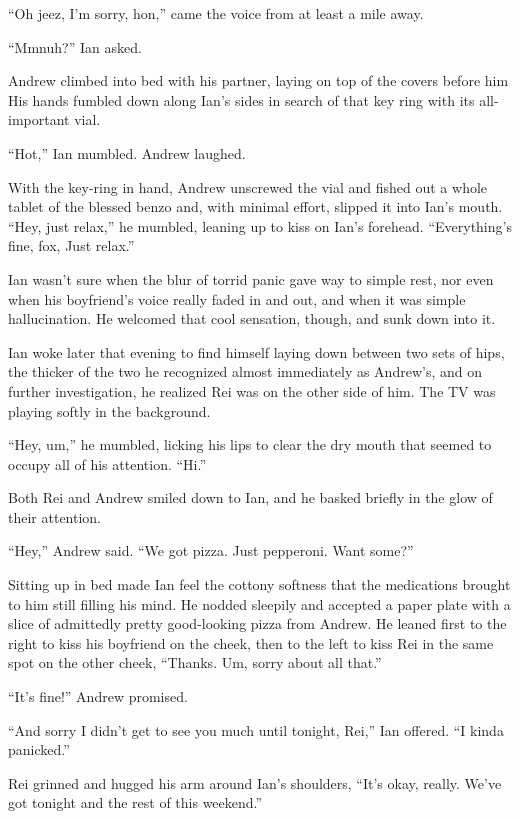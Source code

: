 \secdiv{}

``Oh jeez, I'm sorry, hon,'' came the voice from at least a mile away.

``Mmnuh?'' Ian asked.

Andrew climbed into bed with his partner, laying on top of the covers before him His hands fumbled down along Ian's sides in search of that key ring with its all-important vial.

``Hot,'' Ian mumbled. Andrew laughed.

With the key-ring in hand, Andrew unscrewed the vial and fished out a whole tablet of the blessed benzo and, with minimal effort, slipped it into Ian's mouth. ``Hey, just relax,'' he mumbled, leaning up to kiss on Ian's forehead. ``Everything's fine, fox, Just relax.''

Ian wasn't sure when the blur of torrid panic gave way to simple rest, nor even when his boyfriend's voice really faded in and out, and when it was simple hallucination. He welcomed that cool sensation, though, and sunk down into it.

\secdiv{}

Ian woke later that evening to find himself laying down between two sets of hips, the thicker of the two he recognized almost immediately as Andrew's, and on further investigation, he realized Rei was on the other side of him. The TV was playing softly in the background.

``Hey, um,'' he mumbled, licking his lips to clear the dry mouth that seemed to occupy all of his attention. ``Hi.''

Both Rei and Andrew smiled down to Ian, and he basked briefly in the glow of their attention.

``Hey,'' Andrew said. ``We got pizza. Just pepperoni. Want some?''

Sitting up in bed made Ian feel the cottony softness that the medications brought to him still filling his mind. He nodded sleepily and accepted a paper plate with a slice of admittedly pretty good-looking pizza from Andrew. He leaned first to the right to kiss his boyfriend on the cheek, then to the left to kiss Rei in the same spot on the other cheek, ``Thanks. Um, sorry about all that.''

``It's fine!'' Andrew promised.

``And sorry I didn't get to see you much until tonight, Rei,'' Ian offered. ``I kinda panicked.''

Rei grinned and hugged his arm around Ian's shoulders, ``It's okay, really. We've got tonight and the rest of this weekend.''

